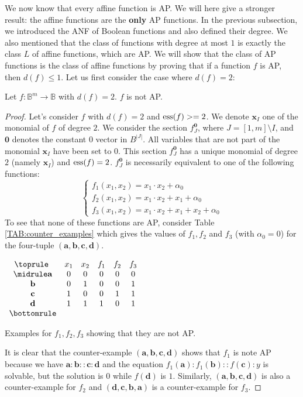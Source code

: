 We now know that every affine function is AP. We will here give a stronger
result: the affine functions are the \textbf{only} AP functions.  In the
previous subsection, we introduced the ANF of Boolean functions and also
defined their degree. We also mentioned that the class of functions with degree
at most $1$ is exactly the class $L$ of affine functions, which are AP.  We
will show that the class of AP functions is the class of affine functions by
proving that if a function $f$ is AP, then $d(f)\leq 1$. Let us first consider
the case where $d(f) = 2$:

\begin{property} \label{degree_2_not_AP}
 Let $f\colon \mathbb{B}^m\to \mathbb{B}$ with $d(f)=2$. $f$ is not AP.
\end{property}
\begin{proof}
  Let's consider $f$ with $d(f) = 2$ and $\operatorname{ess}(f) >= 2$. We denote
  $\mathbf{x}_I$ one of the monomial of $f$ of degree $2$. We consider the
  section $f^{\mathbf{0}}_J$, where $J = [1, m] \setminus I$,  and $\mathbf{0}$
  denotes the constant 0 vector in $B^{|J|}$. All variables that are not part
  of the monomial $\mathbf{x}_I$ have been set to $0$. This section
  $f^{\mathbf{0}}_J$ has a unique monomial of degree $2$ (namely
  $\mathbf{x}_I$) and $\operatorname{ess}(f) = 2$.  $f^{\mathbf{0}}_J$ is necessarily
  equivalent to one of the following functions:
  $$
  \begin{cases}
    f_1(x_1, x_2) = x_1 \cdot x_2 + \alpha_0 \\
    f_2(x_1, x_2) = x_1 \cdot x_2 + x_1 + \alpha_0\\
    f_3(x_1, x_2) = x_1 \cdot x_2 + x_1 + x_2 + \alpha_0
  \end{cases}$$
  To see that none of these functions are AP, consider Table
  \ref{TAB:counter_examples} which gives the values of $f_1, f_2$ and $f_3$
  (with $\alpha_0 = 0$) for the four-tuple $(\mathbf{a}, \mathbf{b},
  \mathbf{c}, \mathbf{d})$.
  \begin{table}[ht]
    \center
  $\begin{array}{cccccc}
    \toprule
    ~ & x_1 & x_2 & f_1 & f_2 & f_3\\
    \midrule
    \mathbf{a} & 0 & 0 & 0 & 0 & 0\\
    \mathbf{b} & 0 & 1 & 0 & 0 & 1\\
    \mathbf{c} & 1 & 0 & 0 & 1 & 1\\
    \mathbf{d} & 1 & 1 & 1 & 0 & 1\\
    \bottomrule
  \end{array}
  $\bigskip
  \caption{Examples for $f_1, f_2, f_3$ showing that they are not AP.}
  \label{TAB:counter_examples}
  \end{table}
  It is clear that the counter-example $(\mathbf{a},\mathbf{b}, \mathbf{c},
  \mathbf{d})$  shows that $f_1$  is note AP because we have $\mathbf{a} :
  \mathbf{b} :: \mathbf{c} : \mathbf{d}$ and the equation $f_1(\mathbf{a}) :
  f_1(\mathbf{b}) :: f(\mathbf{c}) : y$ is solvable, but the solution is $0$
  while $f(\mathbf{d})$ is $1$. Similarly, $(\mathbf{a},\mathbf{b}, \mathbf{c},
  \mathbf{d})$ is also a counter-example for $f_2$ and $(\mathbf{d},\mathbf{c},
  \mathbf{b}, \mathbf{a})$ is a counter-example for $f_3$.


\end{proof}
